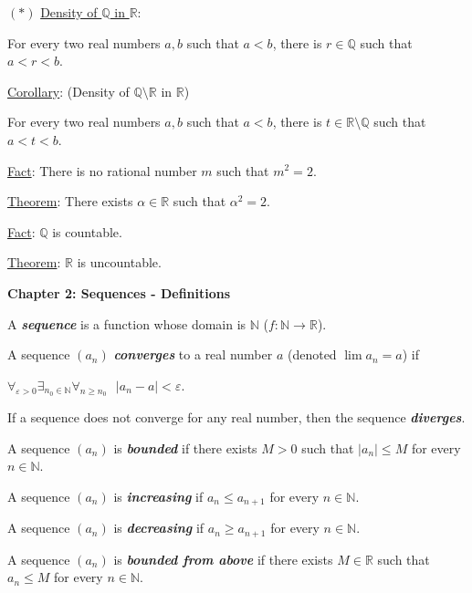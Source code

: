 \documentclass[12pt]{article}
\newcommand{\RR}{\mathbb{R}} %
\newcommand{\NN}{\mathbb{N}}
\newcommand{\QQ}{\mathbb{Q}}
\newcommand\abs[1]{\left| #1 \right|} %
\newcommand{\eps}{\varepsilon}
\newcommand\defword[1]{\textit{\textbf{#1}}}
\begin{document}
$(\ast)$ \underline{Density of $\QQ$ in $\RR$}:

For every two real numbers $a, b$ such that $a < b$, there is $r \in \QQ$ such that $a < r < b$.

\hrulefill

\underline{Corollary}: (Density of $\QQ \setminus \RR$ in $\RR$)

For every two real numbers $a, b$ such that $a < b$, there is $t \in \RR \setminus \QQ$ such that $a < t < b$.

\hrulefill

\underline{Fact}: There is no rational number $m$ such that $m^2 = 2$.

\hrulefill

\underline{Theorem}: There exists $\alpha \in \RR$ such that $\alpha^2 = 2$.

\hrulefill

\underline{Fact}: $\QQ$ is countable.

\hrulefill

\underline{Theorem}: $\RR$ is uncountable.

\pagebreak

\textbf{Chapter 2: Sequences - Definitions}

\hrulefill

A \defword{sequence} is a function whose domain is $\NN$ ($f : \NN \rightarrow \RR$).

\hrulefill

A sequence $(a_n)$ \defword{converges} to a real number $a$ (denoted $\lim a_n = a$) if

$\forall_{\eps > 0} \exists_{n_0 \in \NN} \forall_{n \ge n_0} \text{ } \abs{a_n - a} < \eps$.

\hrulefill

If a sequence does not converge for any real number, then the sequence \defword{diverges}.

\hrulefill

A sequence $(a_n)$ is \defword{bounded} if there exists $M > 0$ such that $\abs{a_n} \le M$ for every $n \in \NN$.

\hrulefill

A sequence $(a_n)$ is \defword{increasing} if $a_n \le a_{n + 1}$ for every $n \in \NN$.

A sequence $(a_n)$ is \defword{decreasing} if $a_n \ge a_{n + 1}$ for every $n \in \NN$.

\hrulefill

A sequence $(a_n)$ is \defword{bounded from above} if there exists $M \in \RR$ such that $a_n \le M$ for every $n \in \NN$.
\end{document}
